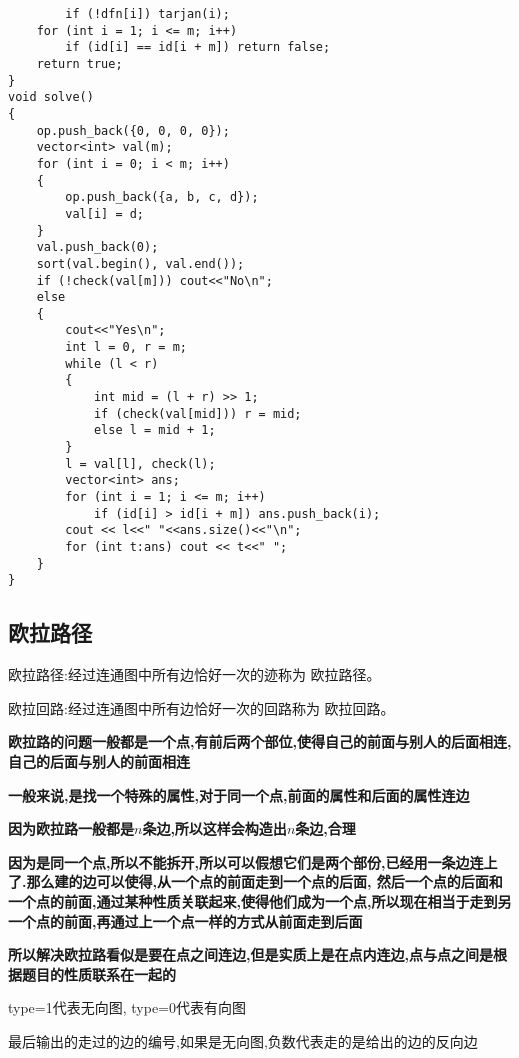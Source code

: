 \documentclass[a4paper, fontset=none]{ctexart}
\begin{document}
\begin{verbatim}
        if (!dfn[i]) tarjan(i);
    for (int i = 1; i <= m; i++)
        if (id[i] == id[i + m]) return false;
    return true;
}
void solve()
{
    op.push_back({0, 0, 0, 0});
    vector<int> val(m);
    for (int i = 0; i < m; i++)
    {
        op.push_back({a, b, c, d});
        val[i] = d;
    }
    val.push_back(0);
    sort(val.begin(), val.end());
    if (!check(val[m])) cout<<"No\n";
    else
    {
        cout<<"Yes\n";
        int l = 0, r = m;
        while (l < r)
        {
            int mid = (l + r) >> 1;
            if (check(val[mid])) r = mid;
            else l = mid + 1;
        }
        l = val[l], check(l);
        vector<int> ans;
        for (int i = 1; i <= m; i++)
            if (id[i] > id[i + m]) ans.push_back(i);
        cout << l<<" "<<ans.size()<<"\n";
        for (int t:ans) cout << t<<" ";
    }
}
\end{verbatim}

\subsection{欧拉路径}

欧拉路径:经过连通图中所有边恰好一次的迹称为 欧拉路径。

欧拉回路:经过连通图中所有边恰好一次的回路称为 欧拉回路。

\textbf{欧拉路的问题一般都是一个点,有前后两个部位,使得自己的前面与别人的后面相连,自己的后面与别人的前面相连}

\textbf{一般来说,是找一个特殊的属性,对于同一个点,前面的属性和后面的属性连边}

\textbf{因为欧拉路一般都是$n$条边,所以这样会构造出$n$条边,合理}

\textbf{因为是同一个点,所以不能拆开,所以可以假想它们是两个部份,已经用一条边连上了.那么建的边可以使得,从一个点的前面走到一个点的后面,
然后一个点的后面和一个点的前面,通过某种性质关联起来,使得他们成为一个点,所以现在相当于走到另一个点的前面,再通过上一个点一样的方式从前面走到后面}

\textbf{所以解决欧拉路看似是要在点之间连边,但是实质上是在点内连边,点与点之间是根据题目的性质联系在一起的}

type=1代表无向图, type=0代表有向图

最后输出的走过的边的编号,如果是无向图,负数代表走的是给出的边的反向边
\end{document}

